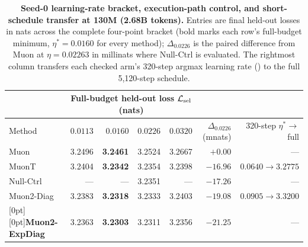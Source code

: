 \begin{table}[tbp]\centering\small
\setlength{\tabcolsep}{5.2pt}
\caption{\textbf{Seed-0 learning-rate bracket, execution-path control, and short-schedule transfer at 130M (2.68B tokens).} Entries are final held-out losses in nats across the complete four-point bracket (bold marks each row's full-budget minimum, $\eta^*=0.0160$ for every method); $\Delta_{0.0226}$ is the paired difference from Muon at $\eta=0.02263$ in millinats where Null-Ctrl is evaluated. The rightmost column transfers each checked arm's 320-step argmax learning rate () to the full 5,120-step schedule.}\label{tab:controls}
\begin{tabularx}{\textwidth}{@{}>{\raggedright\arraybackslash}Xrrrrrr@{}}
\toprule
& \multicolumn{4}{c}{Full-budget held-out loss $\mathcal{L}_{\mathrm{sel}}$ (nats)} & & \\
\cmidrule(lr){2-5}
Method & $0.0113$ & $0.0160$ & $0.0226$ & $0.0320$ & $\Delta_{0.0226}$ (mnats) & 320-step $\eta^* \to$ full \\
\midrule
Muon & 3.2496 & \textbf{3.2461} & 3.2524 & 3.2667 & $+0.00$ & --- \\
MuonT & 3.2404 & \textbf{3.2342} & 3.2354 & 3.2398 & $-16.96$ & $0.0640 \to 3.2775$ \\
Null-Ctrl & --- & --- & 3.2351 & --- & $-17.26$ & --- \\
Muon2-Diag & 3.2383 & \textbf{3.2318} & 3.2333 & 3.2403 & $-19.08$ & $0.0905 \to 3.3200$ \\
\rowcolor{rowtint}[0pt][0pt]\textbf{Muon2-ExpDiag} & 3.2363 & \textbf{3.2303} & 3.2311 & 3.2356 & $\mathbf{-21.25}$ & --- \\
\bottomrule\end{tabularx}
\end{table}
